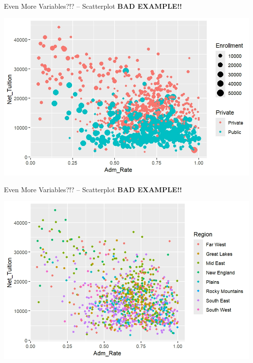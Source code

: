 \documentclass{beamer}
\begin{document}
\begin{frame}{Even More Variables?!? -- Scatterplot}
\textbf{BAD EXAMPLE!!}
\begin{center}
\includegraphics[scale=.7]{img/scatter_by_type_enrollment_all.jpeg}
\end{center}
\end{frame}

\begin{frame}{Even More Variables?!? -- Scatterplot}
\textbf{BAD EXAMPLE!!}
\begin{center}
\includegraphics[scale=.7]{img/scatter_by_region.jpeg}
\end{center}
\end{frame}
\end{document}
